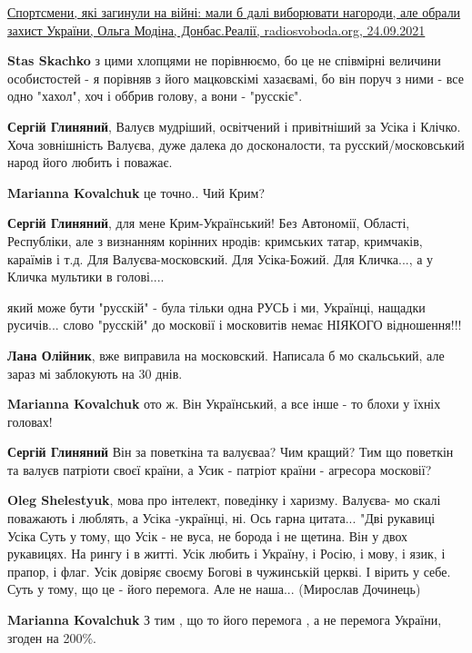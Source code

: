 \begin{itemize}
\begin{itemize}
\href{https://www.radiosvoboda.org/a/30180575.html}{%
Спортсмени, які загинули на війні: мали б далі виборювати нагороди, але обрали захист України, %
Ольга Модіна, Донбас.Реалії, radiosvoboda.org, 24.09.2021%
}

\textbf{Stas Skachko} з цими хлопцями не порівнюємо, бо це не співмірні величини особистостей - я порівняв з його мацковскімі хазаєвамі, бо він поруч з ними - все одно "хахол", хоч і оббрив голову, а вони - "русскіє".

\textbf{Сергій Глиняний}, Валуєв мудріший, освітчений і привітніший за Усіка і Клічко.
Хоча зовнішність Валуєва, дуже далека до досконалости, та русский/московський народ його любить і поважає.

\textbf{Marianna Kovalchuk} це точно.. Чий Крим?

\textbf{Сергій Глиняний}, для мене Крим-Український! Без Автономії, Області, Республіки, але з визнанням корінних нродів: кримських татар, кримчаків, караїмів і т.д.
Для Валуєва-московский.
Для Усіка-Божий.
Для Кличка..., а у Кличка мультики в голові....

який може бути "русскій" - була тільки одна РУСЬ і ми, Українці, нащадки русичів... слово "русскій" до московії і московитів немає НІЯКОГО відношення!!!

\textbf{Лана Олійник}, вже виправила на московский.
Написала б мо скальський, але зараз мі заблокують на 30 днів.

\textbf{Marianna Kovalchuk} ото ж. Він Український, а все інше - то блохи у їхніх головах!

\textbf{Сергій Глиняний}
Він за поветкіна та валуєваа?
Чим кращий?
Тим що поветкін та валуєв патріоти своєї країни, а Усик - патріот країни - агресора московії?

\textbf{Oleg Shelestyuk}, мова про інтелект, поведінку і харизму.
Валуєва- мо скалі поважають і люблять, а Усіка -українці, ні.
Ось гарна цитата...
"Дві рукавиці Усіка
Суть у тому, що Усік - не вуса, не борода і не щетина. Він у двох рукавицях. На рингу і в житті. Усік любить і Україну, і Росію, і мову, і язик, і прапор, і флаг. Усік довіряє своєму Богові в чужинській церкві. І вірить у себе.
Суть у тому, що це - його перемога. Але не наша...
(Мирослав Дочинець)

\textbf{Marianna Kovalchuk}
З тим , що то його перемога , а не перемога України, згоден на 200\%.


\end{itemize}
\end{itemize}

